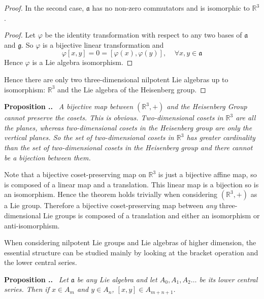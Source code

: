 \documentclass[honours]{UNSWthesis}
\newcommand{\R}{\mathbb{R}}
\newcommand{\g}{\mathfrak{g}}
\newcommand{\1}{\mathbf{e}_{1}}
\newcommand{\2}{\mathbf{e}_{3}}
\newcommand{\3}{\mathbf{e}_{3}}
\newcounter{Item}[section]
\newenvironment{Proposition}{\medskip
                            \refstepcounter{Item}
                            \noindent
                           {\bf Proposition \thesection.\theItem.}\ %
                            \begingroup \sl}
                           {\endgroup\medskip}
\begin{document}
\begin{proof}
In the second case, $\mathfrak{a}$ has no non-zero commutators and is isomorphic to $\R^{3}$. 
\begin{proof}
Let $\varphi$ be the identity transformation with respect to any two bases of $\mathfrak{a}$ and $\g$. So $\varphi$ is a bijective linear transformation and 
\[
\varphi[x,y]=0=[\varphi(x),\varphi(y)], \;\;\;\; \forall x,y \in \mathfrak{a}
\]
Hence $\varphi$ is a Lie algebra isomorphism.
\end{proof}
Hence there are only two three-dimensional nilpotent Lie algebras up to isomorphism: $\R^{3}$ and the Lie algebra of the Heisenberg group.
\end{proof}

\begin{Proposition}
A bijective map between $(\R^{3},+)$ and the Heisenberg Group cannot preserve the cosets.
This is obvious. Two-dimensional cosets in $\R^{3}$ are all the planes, whereas two-dimensional cosets in the Heisenberg group are only the vertical planes. So the set of two-dimensional cosets in $\R^{3}$ has greater cardinality than the set of two-dimensional cosets in the Heisenberg group and there cannot be a bijection between them.
\end{Proposition}


Note that a bijective coset-preserving map on $\R^{3}$ is just a bijective affine map, so is composed of a linear map and a translation. This linear map is a bijection so is an isomorphism. Hence the theorem holds trivially when considering $(\R^{3},+)$ as a Lie group.
Therefore a bijective coset-preserving map between \emph{any} three-dimensional Lie groups is composed of a translation and either an isomorphism or anti-isomorphism.


When considering nilpotent Lie groups and Lie algebras of higher dimension, the essential structure can be studied mainly by looking at the bracket operation and the lower central series.

\begin{Proposition}
Let $\mathfrak{a}$ be any Lie algebra and let $ A_{0},A_{1},A_{2}\ldots$ be its lower central series. Then if $x \in A_{m}$ and $y \in A_{n}$, $[x,y] \in A_{m+n+1}$.
\end{Proposition}
\end{document}
